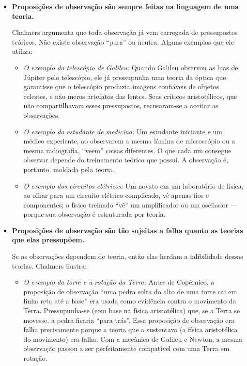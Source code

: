 \documentclass[9pt,a4paper]{extarticle}
\begin{document}
\begin{itemize}
    \item \textbf{Proposições de observação são sempre feitas na linguagem de uma teoria.}

    Chalmers argumenta que toda observação já vem carregada de pressupostos teóricos. Não existe observação ``pura'' ou neutra. Alguns exemplos que ele utiliza:

    \begin{itemize}
        \item \textit{O exemplo do telescópio de Galileu:} Quando Galileu observou as luas de Júpiter pelo telescópio, ele já pressupunha uma teoria da óptica que garantisse que o telescópio produzia imagens confiáveis de objetos celestes, e não meros artefatos das lentes. Seus críticos aristotélicos, que não compartilhavam esses pressupostos, recusaram-se a aceitar as observações.

        \item \textit{O exemplo do estudante de medicina:} Um estudante iniciante e um médico experiente, ao observarem a mesma lâmina de microscópio ou a mesma radiografia, ``veem'' coisas diferentes. O que cada um consegue observar depende do treinamento teórico que possui. A observação é, portanto, moldada pela teoria.

        \item \textit{O exemplo dos circuitos elétricos:} Um novato em um laboratório de física, ao olhar para um circuito elétrico complicado, vê apenas fios e componentes; o físico treinado ``vê'' um amplificador ou um oscilador --- porque sua observação é estruturada por teoria.
    \end{itemize}

    \item \textbf{Proposições de observação são tão sujeitas a falha quanto as teorias que elas pressupõem.}

    Se as observações dependem de teoria, então elas herdam a falibilidade dessas teorias. Chalmers ilustra:

    \begin{itemize}
        \item \textit{O exemplo da torre e a rotação da Terra:} Antes de Copérnico, a proposição de observação ``uma pedra solta do alto de uma torre cai em linha reta até a base'' era usada como evidência contra o movimento da Terra. Pressupunha-se (com base na física aristotélica) que, se a Terra se movesse, a pedra ficaria ``para trás''. Essa proposição de observação era falha precisamente porque a teoria que a sustentava (a física aristotélica do movimento) era falha. Com a mecânica de Galileu e Newton, a mesma observação passou a ser perfeitamente compatível com uma Terra em rotação.


\end{itemize}
\end{itemize}
\end{document}
